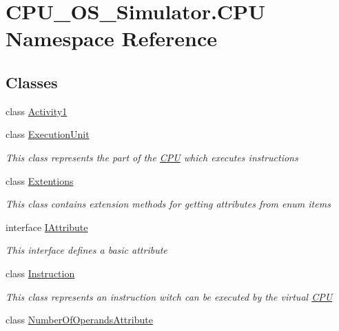 \hypertarget{namespace_c_p_u___o_s___simulator_1_1_c_p_u}{}\section{C\+P\+U\+\_\+\+O\+S\+\_\+\+Simulator.\+C\+P\+U Namespace Reference}
\label{namespace_c_p_u___o_s___simulator_1_1_c_p_u}
\subsection*{Classes}
\begin{DoxyCompactItemize}
\item 
class \hyperlink{class_c_p_u___o_s___simulator_1_1_c_p_u_1_1_activity1}{Activity1}
\item 
class \hyperlink{class_c_p_u___o_s___simulator_1_1_c_p_u_1_1_execution_unit}{Execution\+Unit}
\begin{DoxyCompactList}\small\item\em This class represents the part of the \hyperlink{namespace_c_p_u___o_s___simulator_1_1_c_p_u}{C\+P\+U} which executes instructions \end{DoxyCompactList}\item 
class \hyperlink{class_c_p_u___o_s___simulator_1_1_c_p_u_1_1_extentions}{Extentions}
\begin{DoxyCompactList}\small\item\em This class contains extension methods for getting attributes from enum items \end{DoxyCompactList}\item 
interface \hyperlink{interface_c_p_u___o_s___simulator_1_1_c_p_u_1_1_i_attribute}{I\+Attribute}
\begin{DoxyCompactList}\small\item\em This interface defines a basic attribute \end{DoxyCompactList}\item 
class \hyperlink{class_c_p_u___o_s___simulator_1_1_c_p_u_1_1_instruction}{Instruction}
\begin{DoxyCompactList}\small\item\em This class represents an instruction witch can be executed by the virtual \hyperlink{namespace_c_p_u___o_s___simulator_1_1_c_p_u}{C\+P\+U} \end{DoxyCompactList}\item 
class \hyperlink{class_c_p_u___o_s___simulator_1_1_c_p_u_1_1_number_of_operands_attribute}{Number\+Of\+Operands\+Attribute}

\end{DoxyCompactItemize}

